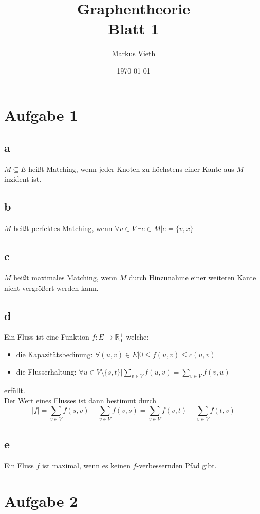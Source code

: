 \documentclass[a4paper,11pt,twoside]{scrartcl}
\title{Graphentheorie\\ Blatt 1}
\author{Markus Vieth}
\date{\today}
\begin{document}
\newcommand{\cor}[1]{\textcolor{red}{\textit{#1}}}
\maketitle
\cleardoublepage
\pagestyle{myheadings}

\newpage
\section*{Aufgabe 1}
\subsection*{a}
$M \subseteq E$ heißt Matching, wenn jeder Knoten zu höchstens einer Kante aus $M$ inzident ist.
\subsection*{b}
$M$ heißt \underline{perfektes} Matching, wenn $\forall v \in V~ \exists e \in M | e = \{v,x\}$
\subsection*{c}
$M$ heißt \underline{maximales} Matching, wenn $M$ durch Hinzunahme einer weiteren Kante nicht vergrößert werden kann.
\subsection*{d}
Ein Fluss ist eine Funktion $f:E\rightarrow\mathbb{R}^+_0$ welche:
\begin{itemize}
	\item die Kapazitätsbedinung: $\forall(u,v)\in E| 0 \leq f(u,v) \leq c(u,v)$
	\item die Flusserhaltung: $\forall u \in V \setminus\{ s,t \} | \sum_{v\in V} f(u,v) = \sum_{v\in V} f(v,u)$
\end{itemize} erfüllt.\\
Der Wert eines Flusses ist dann bestimmt durch \[|f| = \sum_{v\in V} f(s,v) - \sum_{v\in V} f(v,s) = \sum_{v\in V} f(v,t) - \sum_{v\in V} f(t,v)\]
\subsection*{e}
Ein Fluss $f$ ist maximal, wenn es keinen $f$-verbessernden Pfad gibt.
\section*{Aufgabe 2}
\end{document}
